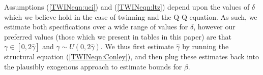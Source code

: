 Assumptions (\ref{TWINeqn:uci}) and (\ref{TWINeqn:ltz}) depend upon the values
of $\delta$ which we believe hold in the case of twinning and the Q-Q equation.
As such, we estimate both specifications over a wide range of values for 
$\delta$, however our preferred values (those which we present in tables in this 
paper) are that $\gamma \in [0,2\hat\gamma]$ and $\gamma \sim U(0,2\hat\gamma)$.
We thus first estimate $\hat\gamma$ by running the structural equation 
(\ref{TWINeqn:Conley}), and then plug these estimates back into the 
\citeauthor{Conleyetal2012} plausibly exogenous approach to estimate bounds for
$\beta$.

